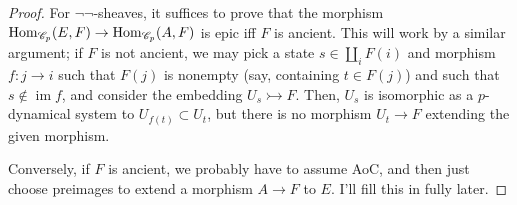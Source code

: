 \documentclass{amsart}
\begin{document}
\begin{proof}
  For $\neg\neg$-sheaves, it suffices to prove that the morphism $\operatorname{Hom}_{\mathscr{C}_p}(E,F) \rightarrow \operatorname{Hom}_{\mathscr{C}_p}(A,F)$ is epic iff $F$ is ancient.
  This will work by a similar argument;
  if $F$ is not ancient, we may pick a state $s \in \coprod_i F(i)$ and morphism $f:j \rightarrow i$ such that $F(j)$ is nonempty (say, containing $t \in F(j)$) and such that $s \not\in \operatorname{im} f$, and consider the embedding $U_s \rightarrowtail F$.
  Then, $U_s$ is isomorphic as a $p$-dynamical system to $U_{f(t)} \subset U_t$, but there is no morphism $U_t \rightarrow F$ extending the given morphism.

  Conversely, if $F$ is ancient, we probably have to assume AoC, and then just choose preimages to extend a morphism $A \rightarrow F$ to $E$.
  I'll fill this in fully later.

   
\end{proof}
\end{document}
